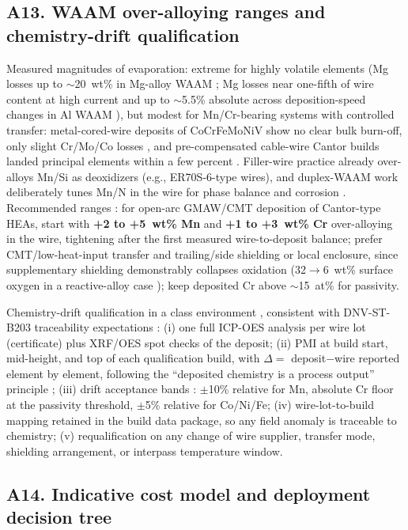 \subsection{A13. WAAM over-alloying ranges and chemistry-drift qualification}
\label{sec:a13}

Measured magnitudes of evaporation: extreme for highly volatile elements (Mg losses up to $\sim$20~wt\% in Mg-alloy WAAM \cite{waam_mg2026}; Mg losses near one-fifth of wire content at high current and up to $\sim$5.5\% absolute across deposition-speed changes in Al WAAM \cite{jme_5087}), but modest for Mn/Cr-bearing systems with controlled transfer: metal-cored-wire deposits of CoCrFeMoNiV show no clear bulk burn-off, only slight Cr/Mo/Co losses \cite{treutler_waam}, and pre-compensated cable-wire Cantor builds landed principal elements within a few percent \cite{osintsev_waam}. Filler-wire practice already over-alloys Mn/Si as deoxidizers (e.g., ER70S-6-type wires), and duplex-WAAM work deliberately tunes Mn/N in the wire for phase balance and corrosion \cite{waam_review2026}. Recommended ranges \prop{}: for open-arc GMAW/CMT deposition of Cantor-type HEAs, start with \textbf{+2 to +5~wt\% Mn} and \textbf{+1 to +3~wt\% Cr} over-alloying in the wire, tightening after the first measured wire-to-deposit balance; prefer CMT/low-heat-input transfer and trailing/side shielding or local enclosure, since supplementary shielding demonstrably collapses oxidation (32$\to$6~wt\% surface oxygen in a reactive-alloy case \cite{waam_mg2026}); keep deposited Cr above $\sim$15~at\% for passivity.

Chemistry-drift qualification in a class environment \prop{}, consistent with DNV-ST-B203 traceability expectations \cite{dnvstb203}: (i) one full ICP-OES analysis per wire lot (certificate) plus XRF/OES spot checks of the deposit; (ii) PMI at build start, mid-height, and top of each qualification build, with $\Delta = $ deposit$-$wire reported element by element, following the ``deposited chemistry is a process output'' principle \cite{waam_mg2026}; (iii) drift acceptance bands \prop{}: $\pm$10\% relative for Mn, absolute Cr floor at the passivity threshold, $\pm$5\% relative for Co/Ni/Fe; (iv) wire-lot-to-build mapping retained in the build data package, so any field anomaly is traceable to chemistry; (v) requalification on any change of wire supplier, transfer mode, shielding arrangement, or interpass temperature window.

\subsection{A14. Indicative cost model and deployment decision tree}
\label{sec:a14}

